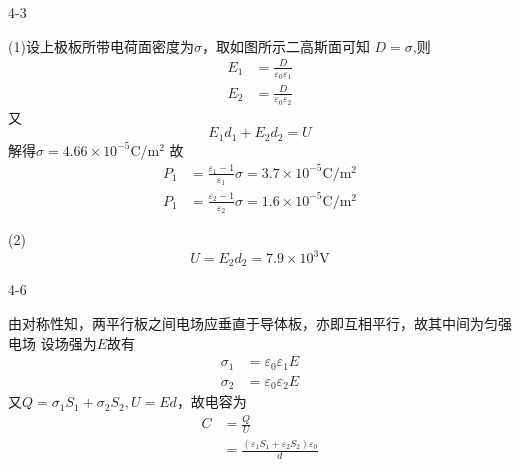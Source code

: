 \documentclass{phyasgn}
\makeatletter
\newcommand{\Rmnum}[1]{\expandafter\@slowromancap\romannumeral #1@}
\makeatother
\begin{document}
{\heiti\color{red} 4-3}
\begin{sol}
    \begin{figure}[!h]
    \end{figure}\par
(1)设上极板所带电荷面密度为$\sigma$，取如图所示二高斯面可知
$D=\sigma$,则
$$\begin{aligned}
    E_1&=\frac{D}{\varepsilon_0\varepsilon_1}\\
    E_2&=\frac{D}{\varepsilon_0\varepsilon_2}
\end{aligned}$$
又
$$
E_1d_1+E_2d_2=U
$$
解得$\sigma=4.66\times 10^{-5}\mathrm{C/m^2}$
故
$$\begin{aligned}
    P_1&=\frac{\varepsilon_1-1}{\varepsilon_1}\sigma=3.7\times 10^{-5}\mathrm{C/m^2}\\
    P_1&=\frac{\varepsilon_2-1}{\varepsilon_2}\sigma=1.6\times 10^{-5}\mathrm{C/m^2}
\end{aligned}$$\par
(2)$$U=E_2d_2=7.9\times 10^3\mathrm{V}$$
\end{sol}\par

{\heiti\color{red} 4-6}
\begin{sol}
由对称性知，两平行板之间电场应垂直于导体板，亦即互相平行，故其中间为匀强电场
设场强为$E$故有
$$\begin{aligned}
    \sigma_1&=\varepsilon_0\varepsilon_1E\\
    \sigma_2&=\varepsilon_0\varepsilon_2E
\end{aligned}$$
又$Q=\sigma_1S_1+\sigma_2S_2,U=Ed$，故电容为
$$\begin{aligned}
    C&=\frac{Q}{U}\\
    &=\frac{(\varepsilon_1S_1+\varepsilon_2S_2)\varepsilon_0}{d}
\end{aligned}$$
\end{sol}\par
\end{document}
